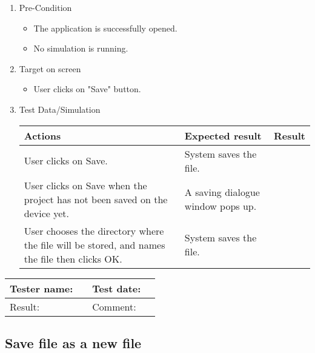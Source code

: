 \begin{enumerate}
	\item Pre-Condition
	\begin{itemize}
		\item The application is successfully opened.
		\item No simulation is running.
	\end{itemize}
	\item Target on screen
	\begin{itemize}
		\item User clicks on "Save" button.
	\end{itemize}
	\item Test Data/Simulation
	\begin{tabularx}{\textwidth}{|X|X|p{2.5cm}|}\hline
		Actions & Expected result & Result \\\hline
		User clicks on Save. & System saves the file.  & \pass \\\hline 
		User clicks on Save when the project has not been saved on the device yet. & A saving dialogue window pops up. & \pass \\\hline
		User chooses the directory where the file will be stored, and names the file then clicks OK. & System saves the file. & \pass \\\hline 
	\end{tabularx}
\end{enumerate}

\begin{tabularx}{\textwidth}{|p{3cm}X|p{3cm}X|}\hline
	Tester name: &  & Test date: & \\\hline
	Result: &  \pass & Comment: & \\\hline
\end{tabularx}


\subsection{Save file as a new file}

